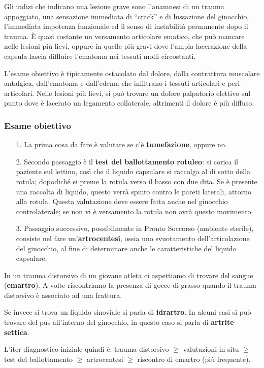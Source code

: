 Gli indizi che indicano una lesione grave sono l'anamnesi di un trauma appoggiato, una sensazione immediata di ``crack'' e di lussazione del ginocchio, l'immediata impotenza funzionale ed il senso di instabilità permanente dopo il trauma. È quasi costante un versamento articolare ematico, che può mancare nelle lesioni più lievi, oppure in quelle più gravi dove l'ampia lacerazione della capsula lascia diffluire l'ematoma nei tessuti molli circostanti.

L'esame obiettivo è tipicamente ostacolato dal dolore, dalla contrattura muscolare antalgica, dall'ematoma e dall'edema che infiltrano i tessuti articolari e peri-articolari. Nelle lesioni più lievi, si può trovare un dolore palpatorio elettivo sul punto dove è lacerato un legamento collaterale, altrimenti il dolore è più diffuso.

\subsubsection{Esame obiettivo}
\begin{itemize}
\item[1.] La prima cosa da fare è valutare se c'è \textbf{tumefazione}, oppure no.
\item[2.] Secondo passaggio è il \textbf{test del ballottamento rotuleo}: si corica il paziente sul lettino, così che il liquido capsulare si raccolga al di sotto della rotula; dopodiché si preme la rotula verso il basso con due dita. Se è presente una raccolta di liquido, questo verrà spinto contro le pareti laterali, attorno alla rotula. Questa valutazione deve essere fatta anche nel ginocchio controlaterale; se non vi è versamento la rotula non avrà questo movimento.
\item[3.] Passaggio successivo, possibilmente in Pronto Soccorso (ambiente sterile), consiste nel fare un'\textbf{artrocentesi}, ossia uno svuotamento dell'articolazione del ginocchio, al fine di determinare anche le caratteristiche del liquido capsulare.
\end{itemize}
In un trauma distorsivo di un giovane atleta ci aspettiamo di trovare del sangue (\textbf{emartro}). A volte riscontriamo la presenza di gocce di grasso quando il trauma distorsivo è associato ad una frattura.

Se invece si trova un liquido sinoviale si parla di \textbf{idrartro}.
In alcuni casi si può trovare del pus all'interno del ginocchio, in questo caso si parla di \textbf{artrite
settica}.

L'iter diagnostico iniziale quindi è:
trauma distorsivo $\ge$ valutazioni in situ $\ge$ test del ballottamento $\ge$ artrocentesi $\ge$ riscontro di emartro (più frequente).

